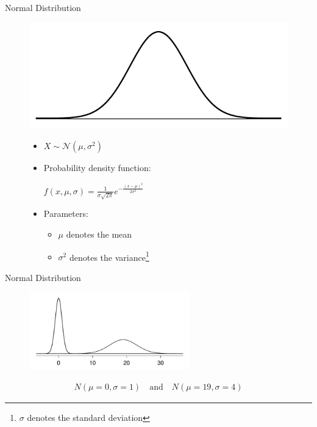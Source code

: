 \documentclass[12pt,a4paper]{beamer}
\begin{document}
\begin{frame}{Normal Distribution}
	\begin{figure}
	 	\centering
		\begin{minipage}{.5\textwidth}
		  \centering
	\includegraphics[width=\textwidth]{figures/simpleNormal/simpleNormal}
	\end{minipage}%
	\begin{minipage}{\textwidth}
	  \begin{itemize}
		\item $X\sim \mathcal{N}(\mu,\sigma^2)$
		\item Probability density 
		function:

		$f(x,\mu,\sigma)=\frac{1}{\sigma\sqrt{2\pi}}e^{-\frac{(x-\mu)^2}{2\sigma^2}}$
		\item Parameters:
		\begin{itemize}
			\item $\mu$ denotes the mean
			\item $\sigma^2$ denotes the variance\footnote{ $\sigma$ denotes the standard deviation}
		\end{itemize}
		\end{itemize}
\end{minipage}
\end{figure}
\end{frame}
\begin{frame}{Normal Distribution}
	\begin{figure}[hht]
	\centering
	\includegraphics[width=0.62\textwidth]{figures/twoSampleNormalsStacked/twoSampleNormalsStacked}
	\end{figure}
	\begin{align*}
	N(\mu=0,\sigma=1)\quad\text{and}\quad N(\mu=19,\sigma=4)
	\end{align*}
\end{frame}
\end{document}
